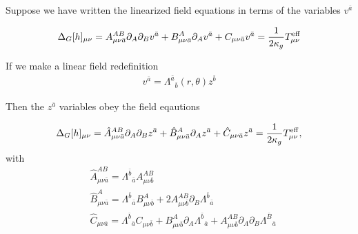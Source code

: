 \documentclass[aps,prd,amsmath,showpacs,amssymb,superscriptaddress,nofootinbib,longbibliography,eqsecnum,preprintnumbers]{revtex4-1}
\begin{document}
Suppose we have written the linearized field equations in terms of the variables $v^{\bar a}$

\begin{align}
\Delta_G[h]_{\mu\nu}= A_{\mu \nu \bar a}^{AB}\partial_A\partial_B v^{\bar a} + B_{\mu \nu \bar a}^{A}\partial_A v^{\bar a}+C_{\mu \nu \bar a}v^{\bar a} =\frac{1}{2\kappa_g} T_{\mu\nu}^{\rm eff}
\end{align}

If we make a linear field redefinition
\begin{align}
v^{\bar a}=\Lambda^{\bar a}{}_{\bar b}(r,\theta)z^{\bar b}
\end{align}

Then the $z^{\bar a}$ variables obey the field eqautions

\begin{align}
\Delta_G[h]_{\mu\nu}= \hat A_{\mu \nu \bar a}^{AB}\partial_A\partial_B z^{\bar a} + \hat B_{\mu \nu \bar a}^{A}\partial_A z^{\bar a}+\hat C_{\mu \nu \bar a}z^{\bar a} =\frac{1}{2\kappa_g} T_{\mu\nu}^{\rm eff},
\end{align}
with 
\begin{align}
&\hat A_{\mu \nu \bar a}^{AB}=\Lambda^{\bar b}{}_{\bar a} A_{\mu\nu\bar b}^{AB} \nonumber \\
&\hat  B_{\mu\nu \bar a}^A=\Lambda^{\bar b}{}_{\bar a}B_{\mu\nu \bar b}^A+2A_{\mu \nu \bar b}^{AB}\partial_B\Lambda^{\bar b}{}_{\bar a} \nonumber \\
&\hat C_{\mu\nu\bar a}=\Lambda^{\bar b}{}_{\bar a}C_{\mu\nu \bar b}+B^A_{\mu\nu\bar b}\partial_{A}\Lambda^{\bar b}{}_{\bar a} +A_{\mu\nu \bar b}^{AB}\partial_A\partial_B\Lambda^{\bar B}{}_{\bar a}
\end{align}



\end{document}
